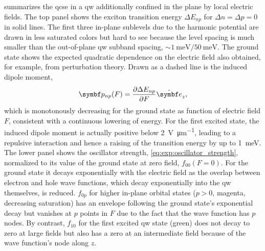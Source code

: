  summarizes the \gls{qcse} in a \gls{qw} additionally confined in the plane by local electric fields.
The top panel shows the exciton transition energy $\Delta E_{np}$ for $\Delta n = \Delta p = 0$ in solid lines.
The first three in-plane sublevels due to the harmonic potential are drawn in less saturated colors but hard to see because the level spacing is much smaller than the out-of-plane \gls{qw} subband spacing, $\sim\qty{1}{\milli\electronvolt}/\qty{50}{\milli\electronvolt}$.
The ground state shows the expected quadratic dependence on the electric field also obtained, for example, from perturbation theory.
Drawn as a dashed line is the induced dipole moment,
\begin{equation}
    \bvec{p}_{np}(F) = \pdv{\Delta E_{np}}{F}\ubvec{z},
\end{equation}
which is monotonously decreasing for the ground state as function of electric field $F$, consistent with a continuous lowering of energy.
For the first excited state, the induced dipole moment is actually positive below \qty{2}{\volt\per\micro\meter}, leading to a repulsive interaction and hence a raising of the transition energy by up to \qty{1}{\milli\electronvolt}.
The lower panel shows the oscillator strength, \cref{eq:exp:oscillator_strength}, normalized to its value of the ground state at zero field, $f_{00}(F=0)$.
For the ground state it decays exponentially with the electric field as the overlap between electron and hole wave functions, which decay exponentially into the \gls{qw} themselves, is reduced.
$f_{0p}$ for higher in-plane orbital states ($p > 0$, magenta, decreasing saturation) has an envelope following the ground state's exponential decay but vanishes at $p$ points in $F$ due to the fact that the wave function has $p$ nodes.
By contrast, $f_{10}$ for the first excited \gls{qw} state (green) does not decay to zero at large fields but also has a zero at an intermediate field because of the wave function's node along $z$.

